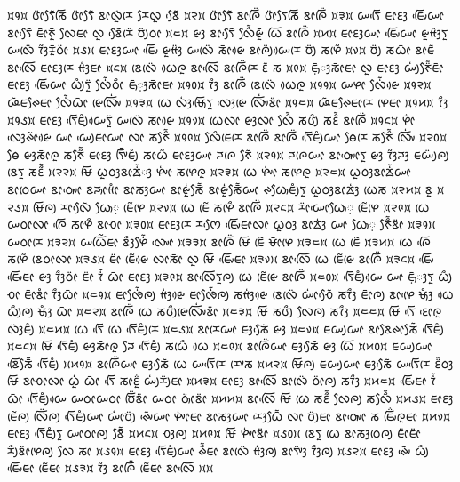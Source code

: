 \noindent
᰿᱁᰿ ᰂᰦᰮᰛᰧᰶᰕᰩ ᰂᰦᰮᰛᰧᰶ ᰣᰦᰜᰬᰮᰌᰨ ᰌᰧᰜᰬ ᰣᰧᰵᰶ ᰿᱂᰿ ᰂᰦᰮᰛᰧᰶ ᰣᰦᰍᰩᰮ ᰂᰦᰮᰛᰧᰕᰩ ᰣᰦᰍᰩᰮ ᰿᱃᰿ ᰠᰛᰩᰵ ᰀᰦᰚᰫ ᰀᰤᰩᰵᰠᰦ ᰣᰦᰛᰧᰵᰶ ᰀᰦᰳᰉᰬᰳ ᰜᰧᰀᰦ ᰜᰬ ᰣᰧᰵᰶᰌᰨᰮ ᰗᰪᰮᰓᰦ ᰿᱄᰿ ᰡᰫ ᰣᰦᰛᰧᰵᰶ ᰜᰧᰰᰶᰡᰬᰳ ᰃᰩ ᰣᰦᰍᰩᰮ ᰿᱅᰿ ᰀᰦᰚᰫᰠᰦ ᰀᰤᰩᰵᰠᰦ ᰡᰬᰙᰫᰮᰛᰬ ᰠᰜᰨᰮ ᰅᰫᰰᰌᰬᰳᰓᰦᰮ ᰿᱆᰿ ᰀᰦᰚᰫᰠᰦ ᰀᰤᰩᰵ ᰡᰬᰙᰫᰮ ᰠᰜᰨᰮ ᰕᰦᰳᰡᰴ ᰣᰦᰍᰪᰮᰠᰴᰌᰨ ᰗᰪᰮ ᰕᰋᰨᰰ ᰿᱇᰿ ᰗᰪᰮ ᰕᰃᰦᰳ ᰣᰦᰀᰶ ᰣᰦᰜᰩᰵ ᰀᰦᰚᰫᰌᰨ ᰙᰫᰭᰀᰦ ᰿᱈᰿ ᰣᰨᰜᰨᰮ ᰃᰴᰍᰬ ᰣᰦᰜᰩᰵ ᰣᰦᰍᰩᰮᰌᰨ ᰚᰶ ᰕ ᰿᱉᰿ ᰀ᰷ᰥᰳᰫᰕᰦᰳᰀᰦ ᰜᰬ ᰀᰦᰚᰫ ᰠᰪᰭᰉᰧᰮᰶᰀᰦᰳ ᰀᰦᰚᰫ ᰀᰤᰩᰵᰠᰦ ᰃᰪᰰᰛᰬᰮ ᰜᰧᰭᰶᰓᰦᰰ ᰀᰥᰳ᰷ᰫᰕᰦᰳᰀᰦ ᰿᱁᱀᰿ ᰅᰫᰰ ᰣᰦᰍᰩᰮ ᰣᰨᰜᰨᰮ ᰃᰴᰍᰬ ᰿᱁᱁᰿ ᰠᰋᰦ ᰜᰧᰭᰶᰡᰴ ᰿᱁᱂᰿ ᰘᰶᰀᰊᰧᰀᰦ ᰜᰧᰭᰶᰃᰦᰳ ᰡᰨᰜᰤᰩᰭ ᰿᱁᱃᰿ ᰃᰨ ᰜᰫᰭᰝᰥᰩᰵᰛᰬ ᰜᰫᰵᰡᰨ ᰜᰤᰩᰭᰣᰦᰮ ᰿᱁᱄᰿ ᰘᰶᰀᰊᰧᰀᰦᰌᰨ ᰋᰨᰀᰦ ᰿᱁᱅᰿ ᰅᰫᰰ ᰿᱁᱆᰿ ᰀᰦᰚᰫ ᰛᰩᰵᰀᰪᰱᰠᰴᰛᰬᰮ ᰠᰜᰨᰮ ᰕᰦᰳᰡᰴ ᰿᱁᱇᰿ ᰃᰨᰜᰦ ᰡᰫᰜᰦ ᰜᰧᰰᰶ ᰕᰂᰪᰰ ᰕᰚᰰᰶ ᰣᰦᰍᰩᰮ ᰿᱁᱈᰿ ᰋᰦᰯ ᰜᰫᰵᰊᰦᰲᰡᰴ ᰠᰦ ᰠᰪᰵᰀᰦᰳᰠᰦ ᰜᰦ ᰕᰉᰧᰰᰶ ᰿᱁᱉᰿ ᰜᰧᰰᰀᰨᰌᰨ ᰣᰦᰍᰩᰮ ᰣᰦᰍᰩᰮ ᰛᰩᰵᰀᰪᰱᰠᰦ ᰟᰧᰌᰨ ᰕᰉᰧᰰᰶ ᰜᰤᰩᰭ ᰿᱂᱀᰿ ᰟᰧ ᰡᰫᰕᰦᰳᰍᰬ ᰕᰉᰧᰰᰶ ᰀᰦᰚᰫ ᰛᰤᰩᰳᰀᰪᰱ ᰕᰦᰃᰰ ᰀᰦᰚᰫᰠᰦ ᰎᰍᰨ ᰉᰧᰶ ᰿᱂᱁᰿ ᰎᰍᰨᰠᰦ ᰣᰦᰓᰥᰤᰦᰵᰛᰬ ᰡᰫ ᰅᰫᰰᰎᰫ ᰀᰠᰪᰮᰍᰪ ᰣᰨᰛᰬ ᰕᰚᰰᰶ ᰿᱂᱂᰿ ᰝᰩ ᰃᰬᰓᰫᰣᰦᰇᰭᰶᰫ ᰋᰤᰦᰭ ᰕᰋᰨᰍᰬ ᰿᱂᱃᰿ ᰃᰨ ᰋᰤᰦᰭ ᰕᰋᰨᰍᰬ ᰿᱂᱄᰿ ᰃᰬᰓᰫᰣᰦᰇᰭᰶᰠᰦ ᰣᰦᰓᰨᰠᰦ ᰣᰦᰓᰥᰤᰦᰵ ᰣᰎᰥᰦᰙᰦᰱ ᰣᰦᰕᰫᰠᰦ ᰣᰦᰡᰬᰭᰕᰧᰳᰶ ᰣᰦᰡᰬᰭᰕᰧᰳᰶᰠᰦ ᰊᰃᰥᰧᰀᰪᰱᰛᰬ ᰃᰬᰓᰫᰣᰦᰇᰫᰭ ᰃᰨᰕ ᰿᱂᱅᰿ ᰣᰬ ᰿᱂᱆᰿ ᰝᰩᰍᰪ ᰌᰦᰜᰧᰵᰶ ᰃᰥᰧ᰷ ᰀᰨᰲᰋᰨ ᰿᱂᱇᰿ ᰃᰨ ᰀᰨᰲ ᰕᰋᰨᰰ ᰣᰦᰍᰩᰮ ᰿᱂᱈᰿ ᰌᰦᰮᰠᰦᰵᰃᰥᰧ᰷ ᰀᰨᰲᰋᰨ ᰿᱂᱉᰿ ᰃᰨ ᰠᰓᰦᰜᰦ ᰍᰩᰵ ᰕᰦᰋᰰ ᰣᰦᰆᰦ ᰿᱃᱀᰿ ᰀᰦᰚᰫᰌᰨ ᰌᰔᰧᰵ ᰀᰤᰩᰵᰀᰦᰜᰦ ᰃᰬᰓᰫ ᰣᰦᰇᰫᰭ ᰠᰦ ᰃᰥᰧ᰷ ᰉᰧᰰᰶᰣᰦᰮ ᰿᱃᱁᰿ ᰠᰓᰦᰌᰨ ᰿᱃᱂᰿ ᰠᰃᰩᰲᰀᰦ ᰣᰫᰰᰋᰧᰭᰶ ᰜᰤᰦᰵ ᰿᱃᱃᰿ ᰣᰦᰍᰩᰮ ᰝᰩ ᰀᰨᰲ ᰝᰦᰳᰋᰨ ᰿᱃᱄᰿ ᰃᰨ ᰀᰨᰲ ᰿᱃᱅᰿ ᰃᰨ ᰍᰩᰵ ᰕᰋᰨᰰ ᰣᰨᰓᰦᰜᰦ ᰿᱃᱆᰿ ᰀᰦᰮ ᰀᰨᰲᰡᰴ ᰜᰦᰕᰦᰳ ᰜᰬ ᰝᰩ ᰀᰤᰩᰵᰀᰦ ᰿᱃᱇᰿ ᰣᰦᰜᰩᰵ ᰃᰨ ᰀᰨᰲᰡᰨ ᰣᰦᰍᰩᰮ ᰿᱃᱈᰿ ᰀᰤᰩᰵ ᰀᰤᰩᰵᰀᰦ ᰡᰫ ᰅᰫᰰᰓᰦᰮ ᰀᰦᰮ ᰅᰭᰶ ᰃᰦᰳ ᰀᰦᰚᰫ ᰿᱃᱉᰿ ᰣᰦᰜᰩᰵᰛᰬᰍᰪ ᰃᰨ ᰀᰨᰲᰡᰨ ᰣᰦᰍᰩᰮ ᰿᱄᱀᰿ ᰛᰩᰵᰀᰪᰱᰠᰴ ᰠᰦ ᰀ᰷ᰥᰳᰫᰛᰬ ᰃᰪᰰ ᰆᰦ ᰀᰦᰳᰣᰦᰱ ᰅᰫᰰᰃᰦᰳ ᰿᱄᱁᰿ ᰀᰦᰒᰧᰭᰶᰍᰪ ᰙᰫᰭᰡᰴ ᰀᰦᰒᰧᰭᰶᰍᰪ ᰕᰙᰫᰭᰡᰴ ᰣᰨᰜᰨᰮ ᰠᰦᰭᰆᰧᰵᰶ ᰕᰅᰫᰰ ᰀᰦᰳᰍᰪ ᰣᰦᰋᰨᰵ ᰝᰥᰫᰱ ᰃᰴ ᰃᰪᰰᰍᰪ ᰝᰥᰫᰱ ᰃᰦᰳ ᰿᱄᱂᰿ ᰣᰦᰍᰩᰮ ᰃᰨ ᰕᰂᰪᰰᰡᰨᰜᰤᰩᰭᰣᰦᰮ ᰿᱄᱃᰿ ᰝᰩ ᰕᰂᰪᰰ ᰜᰧᰍᰪ ᰕᰅᰫᰰ ᰿᱄᱄᰿ ᰝᰩ ᰛᰩᰵ ᰚᰦᰵᰍᰬ ᰜᰫᰮᰀᰪᰱ ᰿᱄᱅᰿ ᰃᰨ ᰛᰩᰵ ᰃᰨ ᰛᰩᰵᰀᰪᰱᰌᰨ ᰿᱄᱆᰿ ᰣᰦᰌᰨᰠᰦ ᰀᰫᰕᰧᰵᰶ ᰡᰫ ᰿᱄᱇᰿ ᰀᰠᰪᰠᰦ ᰣᰦᰣᰧᰊᰦᰕᰧᰳᰶ ᰛᰩᰵᰀᰪᰱ ᰿᱄᱈᰿ ᰝᰩ ᰛᰩᰵᰀᰪᰱ ᰡᰫᰕᰦᰳᰍᰬ ᰎᰧ ᰛᰩᰵᰀᰪᰱ ᰕᰃᰨᰰ ᰃᰴ ᰿᱄᱉᰿ ᰣᰦᰍᰩᰮᰠᰦ ᰀᰫᰕᰧᰵᰶ ᰡᰫ ᰃᰩ ᰿᱅᱀᰿ ᰀᰠᰪᰠᰦ ᰣᰩᰵᰕᰧᰳᰶ ᰛᰩᰵᰀᰪᰱ ᰿᱅᱁᰿ ᰣᰦᰍᰩᰮᰠᰦ ᰀᰫᰕᰧᰵᰶ ᰃᰨ ᰠᰛᰩᰵᰌᰨ ᰌᰤᰨᰕ ᰿᱅᱂᰿ ᰝᰩᰍᰪ ᰀᰠᰪᰠᰦ ᰀᰫᰕᰧᰵᰶ ᰠᰛᰩᰵᰌᰨ ᰚᰮᰶᰓᰫ ᰝᰩ ᰣᰦᰆᰦᰜᰦ ᰃᰬᰭ ᰃᰦᰳ ᰛᰩᰵ ᰕᰦᰚᰬᰯ ᰠᰪᰭᰌᰪᰮᰀᰦ ᰿᱅᱃᰿ ᰀᰦᰚᰫ ᰣᰦᰜᰩᰵ ᰣᰦᰜᰨᰮ ᰓᰦᰮᰍᰪ ᰕᰅᰫᰰ ᰿᱅᱄᰿ ᰀᰤᰩᰵᰀᰦ ᰅᰭᰶ ᰃᰦᰳ ᰛᰩᰵᰀᰪᰱᰠᰴ ᰠᰓᰦᰠᰓᰦ ᰗᰩᰮᰣᰦᰮ ᰠᰓᰦ ᰓᰥᰦᰮᰣᰦᰮ ᰿᱅᱅᰿ ᰣᰦᰜᰩᰵ ᰝᰩ ᰃᰨ ᰕᰚᰰᰶ ᰜᰧᰍᰪ ᰕᰜᰧᰰᰶ ᰿᱅᱆᰿ ᰀᰦᰚᰫ ᰀᰨᰲᰍᰪ ᰜᰩᰮᰍᰪ ᰛᰩᰵᰀᰪᰱᰠᰦ ᰠᰦᰭᰗᰪᰮ ᰊᰤᰵᰶᰠᰦ ᰋᰤᰦᰭᰀᰦ ᰣᰦᰕᰫᰠᰦ ᰌᰫᰵᰃᰧᰳᰶ ᰜᰦ ᰗᰪᰮᰀᰦ ᰣᰦᰓᰥᰤᰦᰵ ᰕ ᰀᰤᰩᰯᰍᰬᰀᰦ ᰿᱅᱇᰿ ᰀᰦᰚᰫ ᰛᰩᰵᰀᰪᰱᰛᰬ ᰠᰦᰓᰦᰍᰪ ᰣᰧᰳᰶ ᰿᱅᱈᰿ ᰆᰫᰍᰪ ᰿᱅᱉᰿ ᰝᰩ ᰋᰤᰦᰭᰣᰦᰮ ᰿᱆᱀᰿ ᰣᰨᰛᰬ ᰃᰨ ᰣᰦᰕᰫᰓᰨᰍᰪ ᰀᰦᰮᰀᰦᰮ ᰌᰪᰰᰣᰦᰮᰋᰨᰍᰪ ᰜᰧ ᰕᰦ ᰿᱆᱁᰿ ᰀᰦᰚᰫ ᰛᰩᰵᰀᰪᰱᰠᰦ ᰊᰰᰶᰀᰦ ᰣᰦᰜᰨᰮ ᰙᰫᰭᰍᰪ ᰣᰦᰛᰤᰫᰮ ᰅᰫᰰᰍᰪ ᰿᱆᱂᰿ ᰀᰦᰚᰫ ᰊᰤᰵᰶ ᰃᰪᰰ ᰀᰤᰩᰵᰀᰦ ᰀᰨᰲᰀᰦ ᰿᱆᱃᰿ ᰅᰫᰰ ᰣᰦᰍᰩᰮ ᰀᰨᰲᰀᰦ ᰣᰦᰜᰩᰵ ᰿᰿ 

\bye

